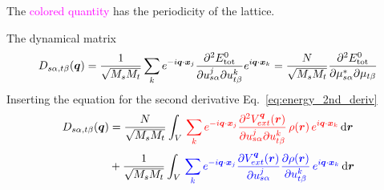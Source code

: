 \begin{frame}[allowframebreaks]
  The \textcolor{magenta}{colored quantity} has the periodicity of the lattice.

  \break

  The dynamical matrix 
  \begin{equation*}
    D_{s\alpha, t\beta}(\boldsymbol{q})
    =
    {1\over\sqrt{M_sM_t}}
    \sum_k
    e^{-i\boldsymbol{q}\cdot\boldsymbol{x}_j}
    \frac{
      \partial^2 E^0_{\text{tot}}
    }{
      \partial {u}_{s\alpha}^j
      \partial {u}_{t\beta}^k
    }
    e^{i\boldsymbol{q}\cdot\boldsymbol{x}_k}
    =
    {N\over\sqrt{M_sM_t}}
    \frac{
      \partial^2 E^0_{\text{tot}}
    }{
      \partial {\mu}_{s\alpha}^*
      \partial {\mu}_{t\beta}
    }
  \end{equation*}
  Inserting the equation for the second derivative Eq.~\ref{eq:energy_2nd_deriv}
  \begin{align*}
    D_{s\alpha, t\beta}(\bdm{q})
    &=
    {N\over\sqrt{M_sM_t}}
    \int_V\,
    \mathcolor{red}{
    \sum_k
    e^{-i\bdm{q}\cdot\bdm{x}_j}
    \frac{
      \partial^2 V_{ext}^{\bdm{q}}(\boldr)
    }{
      \partial {u}_{s\alpha}^j
      \partial {u}_{t\beta}^k
    }\,
    \rho(\boldr)
    \, e^{i\bdm{q}\cdot\bdm{x}_k}
    }
    \,\dt{\boldr} \\[3pt]
    &+
    {1\over\sqrt{M_sM_t}}
    \int_V\,
    \mathcolor{blue}{
    \sum_k
    e^{-i\bdm{q}\cdot\bdm{x}_j}
    \frac{
      \partial V_{ext}^{\bdm{q}}(\boldr)
    }{
      \partial {u}_{s\alpha}^j
    }
    \frac{
      \partial \rho(\boldr)
    }{
      \partial {u}_{t\beta}^k
    }
    \, e^{i\bdm{q}\cdot\bdm{x}_k}
    }
    \,\dt{\boldr} \\[3pt]
  \end{align*}


\end{frame}

